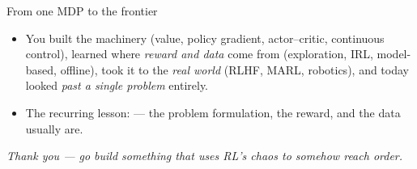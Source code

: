 \begin{frame}{From one MDP to the frontier}
\begin{itemize}\itemsep0.5em
    \item You built the machinery (value, policy gradient, actor--critic, continuous
          control), learned where \emph{reward and data} come from (exploration, IRL,
          model-based, offline), took it to the \emph{real world} (RLHF, MARL, robotics),
          and today looked \emph{past a single problem} entirely.
    \item The recurring lesson:  --- the
          problem formulation, the reward, and the data usually are.
\end{itemize}
\vfill
\begin{center}\itshape
Thank you --- go build something that uses RL's \emph{chaos} to somehow reach \emph{order}.
\end{center}
\end{frame}
